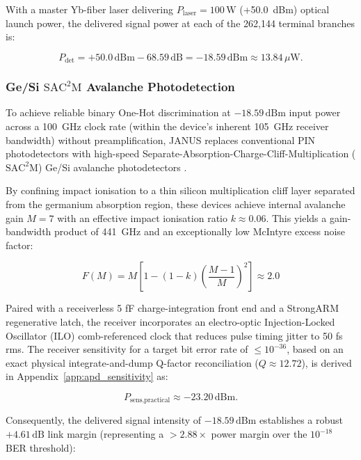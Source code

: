 \documentclass[journal]{IEEEtran}
\begin{document}
With a master Yb-fiber laser delivering $P_{\text{laser}} = 100\,\text{W}$ (+50.0~dBm) optical launch power, the delivered signal power at each of the 262,144 terminal branches is:

\begin{equation}
P_{\text{det}} = +50.0\,\text{dBm} - 68.59\,\text{dB} = -18.59\,\text{dBm} \approx 13.84\,\mu\text{W}.
\end{equation}

\subsubsection{\textbf{Ge/Si $\mathrm{SAC^2M}$ Avalanche Photodetection}}

To achieve reliable binary One-Hot discrimination at $-18.59\,\text{dBm}$ input power across a 100~GHz clock rate (within the device's inherent 105~GHz receiver bandwidth) without preamplification, JANUS replaces conventional PIN photodetectors with high-speed Separate-Absorption-Charge-Cliff-Multiplication ($\mathrm{SAC^2M}$) Ge/Si avalanche photodetectors \cite{Chen2025}. 

By confining impact ionisation to a thin silicon multiplication cliff layer separated from the germanium absorption region, these devices achieve internal avalanche gain $M = 7$ with an effective impact ionisation ratio $k \approx 0.06$. This yields a gain-bandwidth product of 441~GHz and an exceptionally low McIntyre excess noise factor:

\begin{equation}
F(M) = M\left[1-(1-k)
\left(\frac{M-1}{M}\right)^2\right]
\approx 2.0
\end{equation}

Paired with a receiverless 5 fF charge-integration front end and a StrongARM regenerative latch, the receiver incorporates an electro-optic Injection-Locked Oscillator (ILO) comb-referenced clock that reduces pulse timing jitter to 50 fs rms. The receiver sensitivity for a target bit error rate of $\le 10^{-36}$, based on an exact physical integrate-and-dump Q-factor reconciliation ($Q \approx 12.72$), is derived in Appendix~\ref{app:apd_sensitivity} as:

\begin{equation}
P_{\text{sens,practical}} \approx -23.20\,\text{dBm}.
\end{equation}

Consequently, the delivered signal intensity of $-18.59\,\text{dBm}$ establishes a robust $+4.61\,\text{dB}$ link margin (representing a $> 2.88\times$ power margin over the $10^{-18}$ BER threshold):
\end{document}
